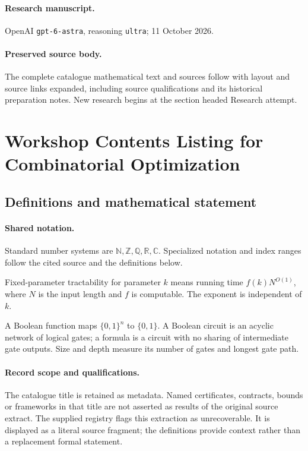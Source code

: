 \documentclass[11pt]{article}
\begin{document}
\paragraph{Research manuscript.} OpenAI \texttt{gpt-6-astra}, reasoning \texttt{ultra}; 11 October 2026.
\paragraph{Preserved source body.} The complete catalogue mathematical text and sources follow with layout and source links expanded, including source qualifications and its historical preparation notes. New research begins at the section headed Research attempt.

\section{Workshop Contents Listing for Combinatorial Optimization}\label{statement}

\subsection{Definitions and mathematical statement}

\paragraph{Shared notation.}Standard number systems are $\mathbb N,\mathbb Z,\mathbb Q,\mathbb R,\mathbb C$. Specialized notation and index ranges follow the cited source and the definitions below.


Fixed-parameter tractability for parameter $k$ means running time $f(k)N^{O(1)}$, where $N$ is the input length and $f$ is computable. The exponent is independent of $k$.

A Boolean function maps $\{0,1\}^n$ to $\{0,1\}$. A Boolean circuit is an acyclic network of logical gates; a formula is a circuit with no sharing of intermediate gate outputs. Size and depth measure its number of gates and longest gate path.
\paragraph{Record scope and qualifications.}
The catalogue title is retained as metadata. Named certificates, contracts, bounds or frameworks in that title are not asserted as results of the original source extract.
The supplied registry flags this extraction as unrecoverable. It is displayed as a literal source fragment; the definitions provide context rather than a replacement formal statement.
\end{document}
